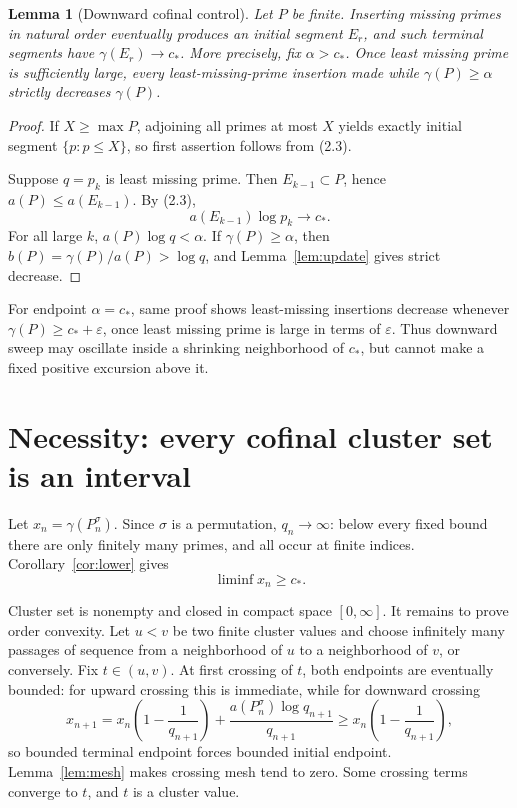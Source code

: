 \documentclass[11pt]{article}
\newtheorem{lemma}[theorem]{Lemma}
\theoremstyle{definition}
\theoremstyle{remark}
\begin{document}
\begin{lemma}[Downward cofinal control]
\label{lem:down}
Let $P$ be finite.  Inserting missing primes in natural order eventually produces an initial
segment $E_r$, and such terminal segments have $\gamma(E_r)\to c_*$.  More precisely, fix
$\alpha>c_*$.  Once least missing prime is sufficiently large, every least-missing-prime
insertion made while $\gamma(P)\geq\alpha$ strictly decreases $\gamma(P)$.
\end{lemma}

\begin{proof}
If $X\geq\max P$, adjoining all primes at most $X$ yields exactly initial segment
$\{p:p\leq X\}$, so first assertion follows from (2.3).

Suppose $q=p_k$ is least missing prime.  Then $E_{k-1}\subset P$, hence
$a(P)\leq a(E_{k-1})$.  By (2.3),
\[
 a(E_{k-1})\log p_k\longrightarrow c_*.
\]
For all large $k$, $a(P)\log q<\alpha$.  If $\gamma(P)\geq\alpha$, then
$b(P)=\gamma(P)/a(P)>\log q$, and Lemma~\ref{lem:update} gives strict decrease.
\end{proof}

For endpoint $\alpha=c_*$, same proof shows least-missing insertions decrease whenever
$\gamma(P)\geq c_*+\varepsilon$, once least missing prime is large in terms of $\varepsilon$.
Thus downward sweep may oscillate inside a shrinking neighborhood of $c_*$, but cannot make a
fixed positive excursion above it.

\section{Necessity: every cofinal cluster set is an interval}
\label{sec:necessity}

Let $x_n=\gamma(P_n^\sigma)$.  Since $\sigma$ is a permutation, $q_n\to\infty$: below every fixed
bound there are only finitely many primes, and all occur at finite indices.
Corollary~\ref{cor:lower} gives
\begin{equation}
 \liminf x_n\geq c_*.                                     \tag{4.1}
\end{equation}

Cluster set is nonempty and closed in compact space $[0,\infty]$.  It remains to prove order
convexity.  Let $u<v$ be two finite cluster values and choose infinitely many passages of sequence
from a neighborhood of $u$ to a neighborhood of $v$, or conversely.  Fix $t\in(u,v)$.  At first
crossing of $t$, both endpoints are eventually bounded: for upward crossing this is immediate,
while for downward crossing
\begin{equation}
 x_{n+1}=x_n\left(1-\frac1{q_{n+1}}\right)
 +\frac{a(P_n^\sigma)\log q_{n+1}}{q_{n+1}}
 \geq x_n\left(1-\frac1{q_{n+1}}\right),                  \tag{4.2}
\end{equation}
so bounded terminal endpoint forces bounded initial endpoint.  Lemma~\ref{lem:mesh} makes crossing
mesh tend to zero.  Some crossing terms converge to $t$, and $t$ is a cluster value.
\end{document}
